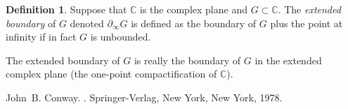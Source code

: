 \documentclass[12pt]{article}
\theoremstyle{theorem}
\theoremstyle{definition}
\newtheorem*{defn}{Definition}
\begin{document}
\begin{defn}
Suppose that ${\mathbb{C}}$ is the complex plane and $G \subset {\mathbb{C}}$.  The {\em extended boundary} of $G$ denoted $\partial_\infty G$ is defined as
the boundary of $G$ plus the point at infinity if in fact $G$ is unbounded.
\end{defn}

The extended boundary of $G$ is really the boundary of $G$ 
in the extended complex plane (the one-point
compactification of ${\mathbb{C}}$).

\begin{thebibliography}{9}
John~B. Conway.
{\em {}}.
Springer-Verlag, New York, New York, 1978.
\end{thebibliography}
\end{document}

